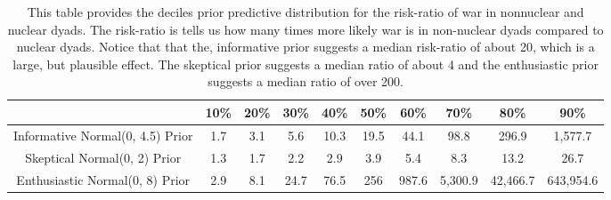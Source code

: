 \begin{table}[H]
\centering
{\scriptsize
\begin{tabular}{|cccccccccc|}
  \hline
 & 10\% & 20\% & 30\% & 40\% & 50\% & 60\% & 70\% & 80\% & 90\% \\ 
  \hline
Informative Normal(0, 4.5) Prior &       1.7 &       3.1 &       5.6 &      10.3 &      19.5 &      44.1 &      98.8 &     296.9 &   1,577.7 \\ 
  Skeptical Normal(0, 2) Prior &       1.3 &       1.7 &       2.2 &       2.9 &       3.9 &       5.4 &       8.3 &      13.2 &      26.7 \\ 
  Enthusiastic Normal(0, 8) Prior &       2.9 &       8.1 &      24.7 &      76.5 &       256 &     987.6 &   5,300.9 &  42,466.7 & 643,954.6 \\ 
   \hline
\end{tabular}
}
\caption{This table provides the deciles prior predictive distribution for the 
                  risk-ratio of war in nonnuclear and nuclear dyads. The risk-ratio is 
                  tells us how many times more likely war is in non-nuclear dyads compared 
                  to nuclear dyads. Notice that that the, informative prior suggests a median 
                  risk-ratio of about 20, which is a large, but plausible effect. The skeptical prior suggests a median 
                  ratio of about 4 and the enthusiastic prior suggests a median ratio of over 
                  200.} 
\label{tab:bm-pppd-deciles}
\end{table}

